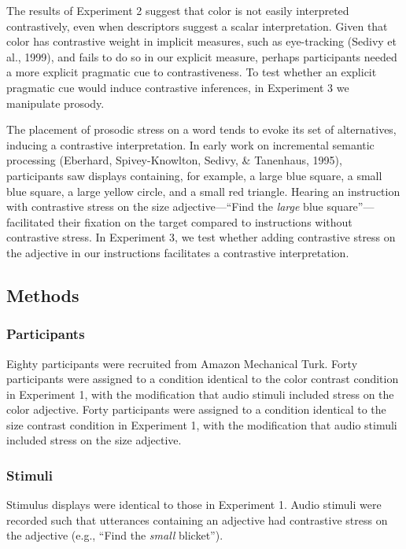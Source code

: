 \documentclass[10pt, letterpaper]{article}
\begin{document}
The results of Experiment 2 suggest that color is not easily interpreted
contrastively, even when descriptors suggest a scalar interpretation.
Given that color has contrastive weight in implicit measures, such as
eye-tracking (Sedivy et al., 1999), and fails to do so in our explicit
measure, perhaps participants needed a more explicit pragmatic cue to
contrastiveness. To test whether an explicit pragmatic cue would induce
contrastive inferences, in Experiment 3 we manipulate prosody.

The placement of prosodic stress on a word tends to evoke its set of
alternatives, inducing a contrastive interpretation. In early work on
incremental semantic processing (Eberhard, Spivey-Knowlton, Sedivy, \&
Tanenhaus, 1995), participants saw displays containing, for example, a
large blue square, a small blue square, a large yellow circle, and a
small red triangle. Hearing an instruction with contrastive stress on
the size adjective---``Find the \emph{large} blue square''---facilitated
their fixation on the target compared to instructions without
contrastive stress. In Experiment 3, we test whether adding contrastive
stress on the adjective in our instructions facilitates a contrastive
interpretation.

\subsection{Methods}\label{methods-1}

\subsubsection{Participants}\label{participants-1}

Eighty participants were recruited from Amazon Mechanical Turk. Forty
participants were assigned to a condition identical to the color
contrast condition in Experiment 1, with the modification that audio
stimuli included stress on the color adjective. Forty participants were
assigned to a condition identical to the size contrast condition in
Experiment 1, with the modification that audio stimuli included stress
on the size adjective.

\subsubsection{Stimuli}\label{stimuli-1}

Stimulus displays were identical to those in Experiment 1. Audio stimuli
were recorded such that utterances containing an adjective had
contrastive stress on the adjective (e.g., ``Find the \emph{small}
blicket'').
\end{document}
